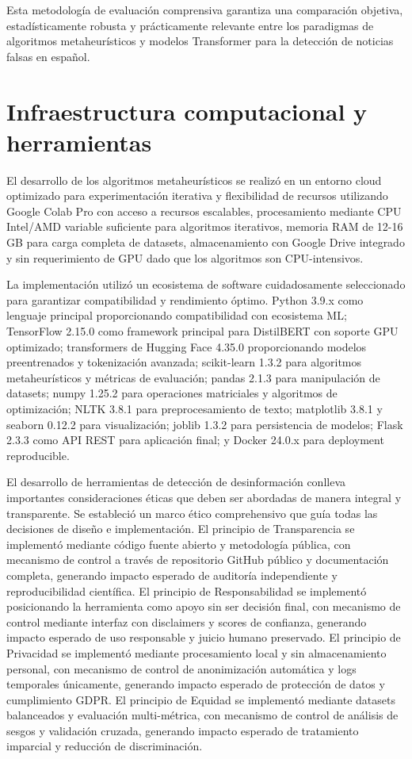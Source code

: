 Esta metodología de evaluación comprensiva garantiza una comparación objetiva, estadísticamente robusta y prácticamente relevante entre los paradigmas de algoritmos metaheurísticos y modelos Transformer para la detección de noticias falsas en español.

\section{Infraestructura computacional y herramientas}
\label{sec:infraestructura}

El desarrollo de los algoritmos metaheurísticos se realizó en un entorno cloud optimizado para experimentación iterativa y flexibilidad de recursos utilizando Google Colab Pro con acceso a recursos escalables, procesamiento mediante CPU Intel/AMD variable suficiente para algoritmos iterativos, memoria RAM de 12-16 GB para carga completa de datasets, almacenamiento con Google Drive integrado y sin requerimiento de GPU dado que los algoritmos son CPU-intensivos.

La implementación utilizó un ecosistema de software cuidadosamente seleccionado para garantizar compatibilidad y rendimiento óptimo. Python 3.9.x como lenguaje principal proporcionando compatibilidad con ecosistema ML; TensorFlow 2.15.0 como framework principal para DistilBERT con soporte GPU optimizado; transformers de Hugging Face 4.35.0 proporcionando modelos preentrenados y tokenización avanzada; scikit-learn 1.3.2 para algoritmos metaheurísticos y métricas de evaluación; pandas 2.1.3 para manipulación de datasets; numpy 1.25.2 para operaciones matriciales y algoritmos de optimización; NLTK 3.8.1 para preprocesamiento de texto; matplotlib 3.8.1 y seaborn 0.12.2 para visualización; joblib 1.3.2 para persistencia de modelos; Flask 2.3.3 como API REST para aplicación final; y Docker 24.0.x para deployment reproducible.

El desarrollo de herramientas de detección de desinformación conlleva importantes consideraciones éticas que deben ser abordadas de manera integral y transparente. Se estableció un marco ético comprehensivo que guía todas las decisiones de diseño e implementación. El principio de Transparencia se implementó mediante código fuente abierto y metodología pública, con mecanismo de control a través de repositorio GitHub público y documentación completa, generando impacto esperado de auditoría independiente y reproducibilidad científica. El principio de Responsabilidad se implementó posicionando la herramienta como apoyo sin ser decisión final, con mecanismo de control mediante interfaz con disclaimers y scores de confianza, generando impacto esperado de uso responsable y juicio humano preservado. El principio de Privacidad se implementó mediante procesamiento local y sin almacenamiento personal, con mecanismo de control de anonimización automática y logs temporales únicamente, generando impacto esperado de protección de datos y cumplimiento GDPR. El principio de Equidad se implementó mediante datasets balanceados y evaluación multi-métrica, con mecanismo de control de análisis de sesgos y validación cruzada, generando impacto esperado de tratamiento imparcial y reducción de discriminación.

